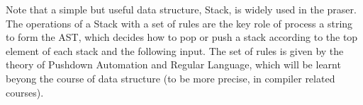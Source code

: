 \documentclass[cn,black,12pt,normal]{elegantnote}
\begin{document}
Note that a simple but useful data structure, Stack, is widely used in the praser. The operations of a Stack with a set of rules are the key role of process a string to form the AST, which decides how to pop or push a stack according to the top element of each stack and the following input. The set of rules is given by the theory of Pushdown Automation and Regular Language, which will be learnt beyong the course of data structure (to be more precise, in compiler related courses).


\newpage

\end{document}
